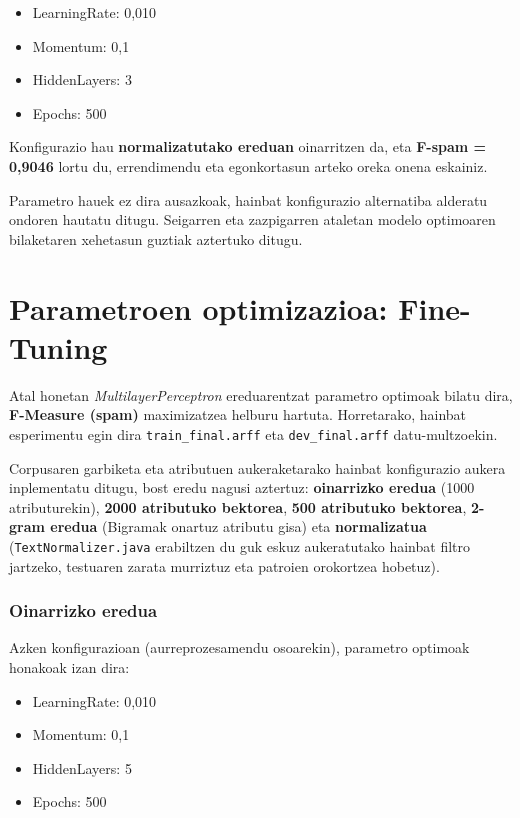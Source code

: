 \documentclass[12pt, a4paper]{article}
\begin{document}
\begin{itemize}
    \item LearningRate: 0,010
    \item Momentum: 0,1
    \item HiddenLayers: 3
    \item Epochs: 500
\end{itemize}

Konfigurazio hau \textbf{normalizatutako ereduan} oinarritzen da, eta \textbf{F-spam = 0,9046} lortu du, errendimendu eta egonkortasun arteko oreka onena eskainiz.

Parametro hauek ez dira ausazkoak, hainbat konfigurazio alternatiba alderatu ondoren hautatu ditugu. Seigarren eta zazpigarren ataletan modelo optimoaren bilaketaren xehetasun guztiak aztertuko ditugu.

\newpage

\section{Parametroen optimizazioa: Fine-Tuning}

Atal honetan \textit{MultilayerPerceptron} ereduarentzat parametro optimoak bilatu dira, \textbf{F-Measure (spam)} maximizatzea helburu hartuta. Horretarako, hainbat esperimentu egin dira \texttt{train\_final.arff} eta \texttt{dev\_final.arff} datu-multzoekin.

Corpusaren garbiketa eta atributuen aukeraketarako hainbat konfigurazio aukera inplementatu ditugu, bost eredu nagusi aztertuz: \textbf{oinarrizko eredua} (1000 atributurekin), \textbf{2000 atributuko bektorea}, \textbf{500 atributuko bektorea}, \textbf{2-gram eredua} (Bigramak onartuz atributu gisa) eta \textbf{normalizatua} (\texttt{TextNormalizer.java} erabiltzen du guk eskuz aukeratutako hainbat filtro jartzeko, testuaren zarata murriztuz eta patroien orokortzea hobetuz).

\subsubsection*{Oinarrizko eredua}
Azken konfigurazioan (aurreprozesamendu osoarekin), parametro optimoak honakoak izan dira:
\begin{itemize}
    \item LearningRate: 0,010
    \item Momentum: 0,1
    \item HiddenLayers: 5
    \item Epochs: 500
\end{itemize}
\end{document}
